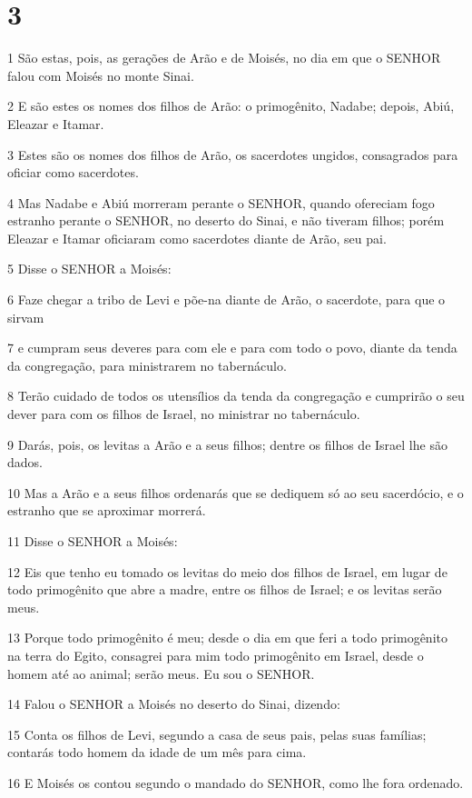 \chapter{3}

\par 1 São estas, pois, as gerações de Arão e de Moisés, no dia em que o SENHOR falou com Moisés no monte Sinai.
\par 2 E são estes os nomes dos filhos de Arão: o primogênito, Nadabe; depois, Abiú, Eleazar e Itamar.
\par 3 Estes são os nomes dos filhos de Arão, os sacerdotes ungidos, consagrados para oficiar como sacerdotes.
\par 4 Mas Nadabe e Abiú morreram perante o SENHOR, quando ofereciam fogo estranho perante o SENHOR, no deserto do Sinai, e não tiveram filhos; porém Eleazar e Itamar oficiaram como sacerdotes diante de Arão, seu pai.
\par 5 Disse o SENHOR a Moisés:
\par 6 Faze chegar a tribo de Levi e põe-na diante de Arão, o sacerdote, para que o sirvam
\par 7 e cumpram seus deveres para com ele e para com todo o povo, diante da tenda da congregação, para ministrarem no tabernáculo.
\par 8 Terão cuidado de todos os utensílios da tenda da congregação e cumprirão o seu dever para com os filhos de Israel, no ministrar no tabernáculo.
\par 9 Darás, pois, os levitas a Arão e a seus filhos; dentre os filhos de Israel lhe são dados.
\par 10 Mas a Arão e a seus filhos ordenarás que se dediquem só ao seu sacerdócio, e o estranho que se aproximar morrerá.
\par 11 Disse o SENHOR a Moisés:
\par 12 Eis que tenho eu tomado os levitas do meio dos filhos de Israel, em lugar de todo primogênito que abre a madre, entre os filhos de Israel; e os levitas serão meus.
\par 13 Porque todo primogênito é meu; desde o dia em que feri a todo primogênito na terra do Egito, consagrei para mim todo primogênito em Israel, desde o homem até ao animal; serão meus. Eu sou o SENHOR.
\par 14 Falou o SENHOR a Moisés no deserto do Sinai, dizendo:
\par 15 Conta os filhos de Levi, segundo a casa de seus pais, pelas suas famílias; contarás todo homem da idade de um mês para cima.
\par 16 E Moisés os contou segundo o mandado do SENHOR, como lhe fora ordenado.
